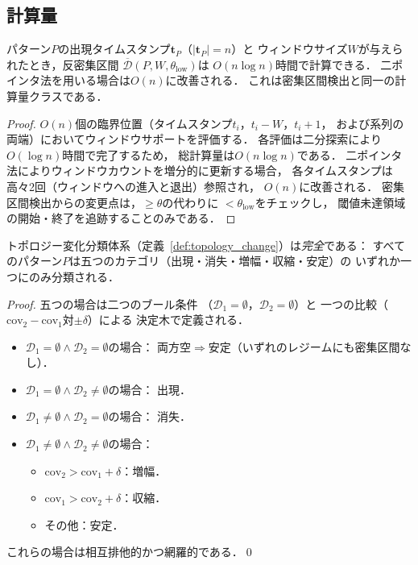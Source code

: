 \subsection{計算量}

\begin{theorem}[反密集区間検出の計算量]\label{thm:complexity_anti}
パターン$P$の出現タイムスタンプ$\mathbf{t}_P$（$|\mathbf{t}_P| = n$）と
ウィンドウサイズ$W$が与えられたとき，反密集区間
$\overline{\mathcal{D}}(P, W, \theta_{\text{low}})$は
$O(n \log n)$時間で計算できる．
二ポインタ法を用いる場合は$O(n)$に改善される．
これは密集区間検出と同一の計算量クラスである．
\end{theorem}

\begin{proof}
$O(n)$個の臨界位置（タイムスタンプ$t_i$，$t_i - W$，$t_i + 1$，
および系列の両端）においてウィンドウサポートを評価する．
各評価は二分探索により$O(\log n)$時間で完了するため，
総計算量は$O(n \log n)$である．
二ポインタ法によりウィンドウカウントを増分的に更新する場合，
各タイムスタンプは高々2回（ウィンドウへの進入と退出）参照され，
$O(n)$に改善される．
密集区間検出からの変更点は，$\geq \theta$の代わりに
$< \theta_{\text{low}}$をチェックし，
閾値未達領域の開始・終了を追跡することのみである．
\end{proof}

\begin{theorem}[構造比較の完全性]\label{thm:completeness}
トポロジー変化分類体系（定義~\ref{def:topology_change}）は\emph{完全}である：
すべてのパターン$P$は五つのカテゴリ（出現・消失・増幅・収縮・安定）の
いずれか一つにのみ分類される．
\end{theorem}

\begin{proof}
五つの場合は二つのブール条件
（$\mathcal{D}_1 = \emptyset$，$\mathcal{D}_2 = \emptyset$）と
一つの比較（$\text{cov}_2 - \text{cov}_1$対$\pm\delta$）による
決定木で定義される．
\begin{itemize}
\item $\mathcal{D}_1 = \emptyset \land \mathcal{D}_2 = \emptyset$の場合：
  両方空$\Rightarrow$安定（いずれのレジームにも密集区間なし）．
\item $\mathcal{D}_1 = \emptyset \land \mathcal{D}_2 \neq \emptyset$の場合：
  出現．
\item $\mathcal{D}_1 \neq \emptyset \land \mathcal{D}_2 = \emptyset$の場合：
  消失．
\item $\mathcal{D}_1 \neq \emptyset \land \mathcal{D}_2 \neq \emptyset$の場合：
  \begin{itemize}
  \item $\text{cov}_2 > \text{cov}_1 + \delta$：増幅．
  \item $\text{cov}_1 > \text{cov}_2 + \delta$：収縮．
  \item その他：安定．
  \end{itemize}
\end{itemize}
これらの場合は相互排他的かつ網羅的である．\qed
\end{proof}
